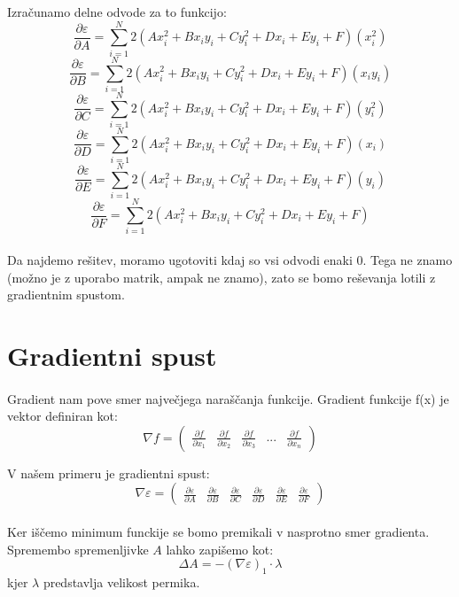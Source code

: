\documentclass[a4paper, 12pt]{article}
\begin{document}
	Izračunamo delne odvode za to funkcijo:
	$$\frac{\partial \varepsilon}{\partial A} = \sum_{i=1}^{N}2(Ax_i^2 + Bx_iy_i + Cy_i^2 + Dx_i + Ey_i + F)(x_i^2)$$
	$$\frac{\partial \varepsilon}{\partial B} = \sum_{i=1}^{N}2(Ax_i^2 + Bx_iy_i + Cy_i^2 + Dx_i + Ey_i + F)(x_iy_i)$$
	$$\frac{\partial \varepsilon}{\partial C} = \sum_{i=1}^{N}2(Ax_i^2 + Bx_iy_i + Cy_i^2 + Dx_i + Ey_i + F)(y_i^2)$$
	$$\frac{\partial \varepsilon}{\partial D} = \sum_{i=1}^{N}2(Ax_i^2 + Bx_iy_i + Cy_i^2 + Dx_i + Ey_i + F)(x_i)$$
	$$\frac{\partial \varepsilon}{\partial E} = \sum_{i=1}^{N}2(Ax_i^2 + Bx_iy_i + Cy_i^2 + Dx_i + Ey_i + F)(y_i)$$
	$$\frac{\partial \varepsilon}{\partial F} = \sum_{i=1}^{N}2(Ax_i^2 + Bx_iy_i + Cy_i^2 + Dx_i + Ey_i + F)$$
	
	\paragraph{}
	Da najdemo rešitev, moramo ugotoviti kdaj so vsi odvodi enaki 0. Tega ne znamo (možno je z uporabo matrik, ampak ne znamo), zato se bomo reševanja lotili z gradientnim spustom.

	\section*{Gradientni spust}
	\paragraph{}
	Gradient nam pove smer največjega naraščanja funkcije. Gradient funkcije f(x) je vektor definiran kot:
	$$\nabla f = \begin{pmatrix}\frac{\partial f}{\partial x_{1}} & \frac{\partial f}{\partial x_{2}} & \frac{\partial f}{\partial x_{3}} & ... & \frac{\partial f}{\partial x_{n}}\end{pmatrix}$$
	
	V našem primeru je gradientni spust:
	$$\nabla \varepsilon = 
	\begin{pmatrix}
	\frac{\partial \varepsilon}{\partial A} &
	\frac{\partial \varepsilon}{\partial B} &
	\frac{\partial \varepsilon}{\partial C} &
	\frac{\partial \varepsilon}{\partial D} &
	\frac{\partial \varepsilon}{\partial E} &
	\frac{\partial \varepsilon}{\partial F}
	\end{pmatrix}$$
	
	\paragraph{}
	Ker iščemo minimum funckije se bomo premikali v nasprotno smer gradienta. Spremembo spremenljivke $A$ lahko zapišemo kot:
	$$\Delta A = -(\nabla \varepsilon)_1 \cdot \lambda$$
	kjer $\lambda$ predstavlja velikost permika. 
	
\end{document}
